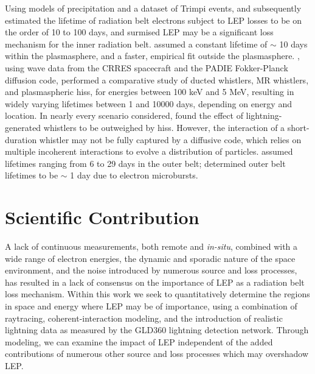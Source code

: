 Using models of precipitation and a dataset of Trimpi events, \cite{Rodger2003} and subsequently \cite{Rodger2010} estimated the lifetime of radiation belt electrons subject to LEP losses to be on the order of 10 to 100 days, and surmised LEP may be a significant loss mechanism for the inner radiation belt. \cite{Shprits2005} assumed a constant lifetime of $\sim$ 10 days within the plasmasphere, and a faster, empirical fit outside the plasmasphere. \cite{Meredith2007}, using wave data from the CRRES spacecraft and the PADIE Fokker-Planck diffusion code, performed a comparative study of ducted whistlers, MR whistlers, and plasmaspheric hiss, for energies between 100 keV and 5 MeV, resulting in widely varying lifetimes between 1 and 10000 days, depending on energy and location. In nearly every scenario considered, \citeauthor{Meredith2007} found the effect of lightning-generated whistlers to be outweighed by hiss. However, the interaction of a short-duration whistler may not be fully captured by a diffusive code, which relies on multiple incoherent interactions to evolve a distribution of particles. \cite{barker2005} assumed lifetimes ranging from 6 to 29 days in the outer belt; \cite{Horne2005} determined outer belt lifetimes to be $\sim$ 1 day due to electron microbursts.



% 

\section{Scientific Contribution}
A lack of continuous measurements, both remote and \emph{in-situ}, combined with a wide range of electron energies, the dynamic and sporadic nature of the space environment, and the noise introduced by numerous source and loss processes, has resulted in a lack of consensus on the importance of LEP as a radiation belt loss mechanism. Within this work we seek to quantitatively determine the regions in space and energy where LEP may be of importance, using a combination of raytracing, coherent-interaction modeling, and the introduction of realistic lightning data as measured by the GLD360 lightning detection network. Through modeling, we can examine the impact of LEP independent of the added contributions of numerous other source and loss processes which may overshadow LEP.

